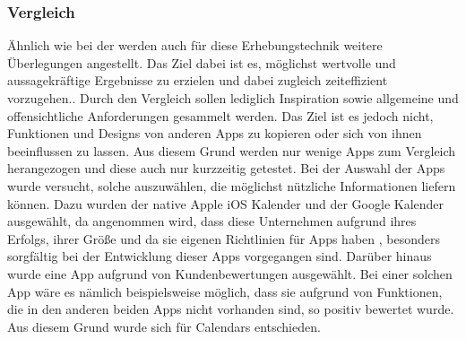 \subsubsection{Vergleich} %
Ähnlich wie bei der  werden auch für diese Erhebungstechnik weitere Überlegungen angestellt. Das Ziel dabei ist es, möglichst wertvolle und aussagekräftige Ergebnisse zu erzielen und dabei zugleich zeiteffizient vorzugehen..%
%
%
\newline%
\myNewSection%
Durch den Vergleich sollen lediglich Inspiration sowie allgemeine und offensichtliche Anforderungen gesammelt werden. %
Das Ziel ist es jedoch nicht, Funktionen und Designs von anderen Apps zu kopieren oder sich von ihnen beeinflussen zu lassen. %
	Aus diesem Grund werden nur wenige Apps zum Vergleich herangezogen und diese auch nur kurzzeitig getestet.%
\newline%
Bei der Auswahl der Apps wurde versucht, solche auszuwählen, die möglichst nützliche Informationen liefern können. %
	Dazu wurden der native Apple iOS Kalender\cite{A_calendarApple} und der Google Kalender\cite{A_calendarGoogle} ausgewählt, da angenommen wird, dass diese Unternehmen aufgrund ihres Erfolgs, ihrer Größe und da sie eigenen Richtlinien für Apps haben \cite{konventionen_platforms_ios, konventionen_guidelinesGoogle}, besonders sorgfältig bei der Entwicklung dieser Apps vorgegangen sind.\newline%
	Darüber hinaus wurde eine App aufgrund von Kundenbewertungen ausgewählt. Bei einer solchen App wäre es nämlich beispielsweise möglich, dass sie aufgrund von Funktionen, die in den anderen beiden Apps nicht vorhanden sind, so positiv bewertet wurde. Aus diesem Grund wurde sich für Calendars\cite{A_calendarReviews} entschieden.%
